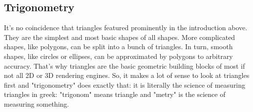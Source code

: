\begin{comment}

https://www.mathplanet.com/education/geometry/perpendicular-and-parallel/angles-parallel-lines-and-transversals

https://thirdspacelearning.com/gcse-maths/geometry-and-measure/angles-in-parallel-lines/

https://thirdspacelearning.com/gcse-maths/geometry-and-measure/angle-rules/

https://thirdspacelearning.com/gcse-maths/geometry-and-measure/alternate-angles/
https://thirdspacelearning.com/gcse-maths/geometry-and-measure/corresponding-angles/

https://thirdspacelearning.com/gcse-maths/geometry-and-measure/supplementary-angles/ aka adjacent?

https://thirdspacelearning.com/gcse-maths/geometry-and-measure/co-interior-angles/ aka neighbor?

https://thirdspacelearning.com/gcse-maths/geometry-and-measure/vertically-opposite-angles/ aka opposite


https://thirdspacelearning.com/gcse-maths/geometry-and-measure/types-of-angles/


https://www.cuemath.com/geometry/alternate-interior-angles/
https://www.cuemath.com/geometry/alternate-exterior-angles/

https://www.mathsisfun.com/geometry/parallel-lines.html
https://www.mathsisfun.com/geometry/consecutive-interior-angles.html
https://www.mathsisfun.com/geometry/alternate-interior-angles.html
https://www.mathsisfun.com/geometry/alternate-exterior-angles.html


\end{comment}


\subsection{Trigonometry}
It's no coincidence that triangles featured prominently in the introduction above. They are the simplest and most basic shapes of all shapes. More complicated shapes, like polygons, can be split into a bunch of triangles. In turn, smooth shapes, like circles or ellipses, can be approximated by polygons to arbitrary accuracy. That's why triangles are the basic geometric building blocks of most if not all 2D or 3D rendering engines. So, it makes a lot of sense to look at triangles first and "trigonometry" does exactly that: it is literally the science of measuring triangles in greek: "trigonom" means triangle and "metry" is the science of measuring something.

